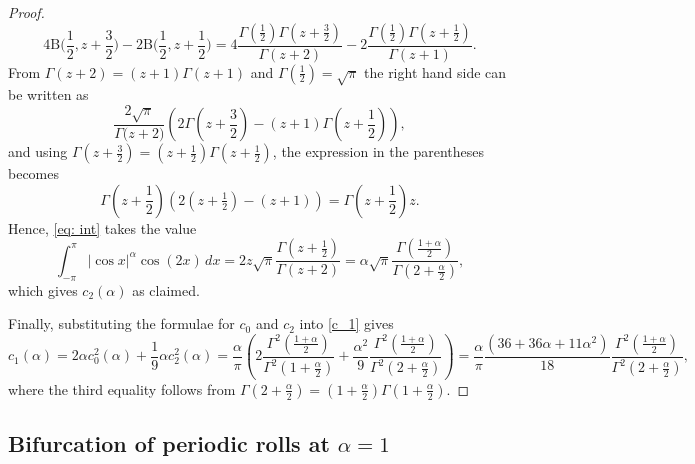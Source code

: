 \documentclass{article}
\numberwithin{equation}{section}
\begin{document}
\begin{proof}
		\begin{equation}
			4 \text{B} \biggl(\frac{1}{2}, z+ \frac{3}{2} \biggr) - 2\text{B} \biggl(\frac{1}{2}, z+ \frac{1}{2} \biggr) = 4\frac{\Gamma(\frac{1}{2}) \Gamma(z+\frac{3}{2})}{\Gamma(z+2)} - 2 \frac{\Gamma (\frac{1}{2}) \Gamma (z+ \frac{1}{2})}{\Gamma (z+1)}.
		\end{equation}
		From $\Gamma(z+2) = (z+1) \Gamma(z+1)$ and $\Gamma (\frac{1}{2}) = \sqrt{\pi}$ the right hand side can be written as  
		\begin{equation}
			\frac{2\sqrt{\pi}}{\Gamma\big(z+2\big)}  \left( 2\Gamma\left(z+\frac{3}{2}\right) - (z+1)\Gamma\left(z+\frac{1}{2}\right) \right), 
		\end{equation}
		and using $\Gamma\left(z+\frac{3}{2}\right) = (z+\frac{1}{2}) \Gamma(z+\frac{1}{2})$, the expression in the parentheses becomes
		\begin{equation} 
			\Gamma\left(z+\frac{1}{2}\right) \left( 2(z+\tfrac{1}{2})- (z+1) \right) = \Gamma\left(z+\frac{1}{2}\right)z.
		\end{equation}
		Hence, \eqref{eq: int} takes the value 
		\begin{equation}
			\int_{-\pi}^{\pi} |\cos x|^\alpha \cos(2x) \,dx = 2z\sqrt{\pi}\frac{ \Gamma(z+\frac{1}{2})}{\Gamma(z+2)} = \alpha \sqrt{\pi}\frac{\Gamma(\frac{1+\alpha}{2})}{\Gamma(2+\frac{\alpha}{2})},
		\end{equation}			
which gives $c_2(\alpha)$ as claimed. 

Finally, substituting the formulae for $c_0$ and $c_2$ into \eqref{c_1}  gives 
		\begin{equation*}
			c_1(\alpha)  =2 \alpha c_0^2(\alpha) + \frac{1}{9} \alpha c_2^2 (\alpha)
= \frac{\alpha}{\pi} \left( 2\frac{\Gamma^2 (\frac{1+\alpha}{2})}{\Gamma^2 (1+\frac{\alpha}{2})} + \frac{\alpha^2}{9} \frac{\Gamma^2 (\frac{1+\alpha}{2})}{\Gamma^2(2+\frac{\alpha}{2})} \right) 
				 = \frac{\alpha}{\pi} \frac{(36+36\alpha + 11\alpha^2)}{18} \frac{\Gamma^2(\frac{1+\alpha}{2})}{\Gamma^2 (2+\frac{\alpha}{2})},
		\end{equation*}
		where the third equality follows from $\Gamma(2+\frac{\alpha}{2}) = (1+\frac{\alpha}{2}) \Gamma(1+\frac{\alpha}{2})$. 		
		\end{proof}


\subsection{Bifurcation of periodic rolls at $\alpha =1$}\label{subsec: Bifurcation of periodic rolls}
	
\end{document}

